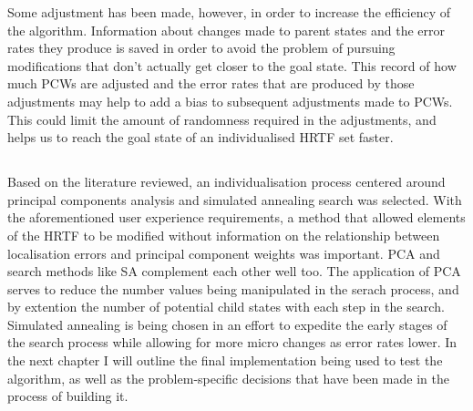 Some adjustment has been made, however, in order to increase the efficiency of the algorithm. Information about changes made to parent states and the error rates they produce is saved in order to avoid the problem of pursuing modifications that don't actually get closer to the goal state. This record of how much PCWs are adjusted and the error rates that are produced by those adjustments may help to add a bias to subsequent adjustments made to PCWs. This could limit the amount of randomness required in the adjustments, and helps us to reach the goal state of an individualised HRTF set faster. 

\subsection*{}
Based on the literature reviewed, an individualisation process centered around principal components analysis and simulated annealing search was selected. With the aforementioned user experience requirements, a method that allowed elements of the HRTF to be modified without information on the relationship between localisation errors and principal component weights was important. PCA and search methods like SA complement each other well too. The application of PCA serves to reduce the number values being manipulated in the serach process, and by extention the number of potential child states with each step in the search. Simulated annealing is being chosen in an effort to expedite the early stages of the search process while allowing for more micro changes as error rates lower. In the next chapter I will outline the final implementation being used to test the algorithm, as well as the problem-specific decisions that have been made in the process of building it. 